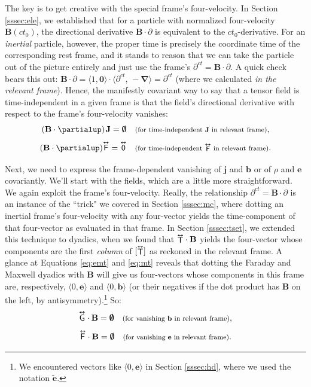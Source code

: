 \documentclass[12pt]{article}
\renewcommand{\vv}[1]{\mathbf{#1}}
\newcommand{\del}{\boldsymbol{\nabla}}
\newcommand{\tightoverset}[2]{%
  \mathop{#2}\limits^{\vbox to -.5ex{\kern-0.75ex\hbox{$#1$}\vss}}}
\newcommand{\inlinedy}[1]{\tightoverset{\text{\tiny$\bm\leftrightarrow$}}{#1}}
\newcommand{\fnoverset}[2]{%
  \mathop{#2}\limits^{\vbox to -.5ex{\kern-0.85ex\hbox{$#1$}\vss}}}
\newcommand{\footnotedy}[1]{\fnoverset{\text{\tiny$\bm\leftrightarrow$}}{#1}}
\newcommand{\capdy}[1]{ \overset{ \text{\tiny$\bm\leftrightarrow$} }{\vphantom{\text{\small{A}}}\smash{#1}} }
\begin{document}
The key is to get creative with the special frame's four-velocity. In Section \ref{sssec:ele}, we established that for a particle with normalized four-velocity $\vv B (ct_0)$, the directional derivative $\vv B \cdot \partialup$ is equivalent to the $ct_0$-derivative. For an \emph{inertial} particle, however, the proper time is precisely the coordinate time of the corresponding rest frame, and it stands to reason that we can take the particle out of the picture entirely and just use the frame's $\partial^{ct} = \vv B \cdot \partialup$. A quick check bears this out: $\vv B \cdot \partialup = \langle 1, \vv 0 \rangle \cdot \langle \partial^{ct}, \, - \del \rangle = \partial^{ct}$ (where we calculated \emph{in the relevant frame}). Hence, the manifestly covariant way to say that a tensor field is time-independent in a given frame is that the field's directional derivative with respect to the frame's four-velocity vanishes:
\begin{equation}\label{eq:timeindj}
( \vv B \cdot \partialup ) \mkern2mu \vv J = \textrm{\mbox{\boldmath $\emptyset$}}  \quad \text{\footnotesize{(for time-independent $\vv J$ in relevant frame)}},
\end{equation}
\begin{equation}\label{eq:timeindf}
( \vv B \cdot \partialup ) \capdy{\mathsf{F}} =  \capdy{\mathsf{0}}  \quad \text{\footnotesize{(for time-independent $\footnotedy{\mathsf{F}}$ in relevant frame)}}.
\end{equation}

Next, we need to express the frame-dependent vanishing of $\vv j$ and $\vv b$ or of $\rho$ and $\vv e$ covariantly. We'll start with the fields, which are a little more straightforward. We again exploit the frame's four-velocity. Really, the relationship $\partial^{ct} = \vv B \cdot \partialup$ is an instance of the ``trick" we covered in Section \ref{sssec:mc}, where dotting an inertial frame's four-velocity with any four-vector yields the time-component of that four-vector as evaluated in that frame. In Section \ref{sssec:tset}, we extended this technique to dyadics, when we found that ${\inlinedy{\mathsf{T}}} \cdot \vv B$ yields the four-vector whose components are the first \emph{column} of $[{\inlinedy{\mathsf{T}}}]$ as reckoned in the relevant frame. A glance at Equations \ref{eq:emt} and \ref{eq:mt} reveals that dotting the Faraday and Maxwell dyadics with $\vv B$ will give us four-vectors whose components in this frame are, respectively, $\langle 0, \vv e \rangle$ and $\langle 0, \vv b \rangle$ (or their negatives if the dot product has $\vv B$ on the left, by antisymmetry).\footnote{We encountered vectors like $\langle 0, \vv e \rangle$ in Section \ref{sssec:hd}, where we used the notation $\tilde{\vv e}$.} So:
\begin{equation}\label{eq:nob}
\capdy{\mathsf{G}} \cdot \vv B = \textrm{\mbox{\boldmath $\emptyset$}}  \quad \text{\footnotesize{(for vanishing $\vv b$ in relevant frame)}},
\end{equation}
\begin{equation}\label{eq:noe}
\capdy{\mathsf{F}} \cdot \vv B = \textrm{\mbox{\boldmath $\emptyset$}}  \quad \text{\footnotesize{(for vanishing $\vv e$ in relevant frame)}}.
\end{equation}
\end{document}
